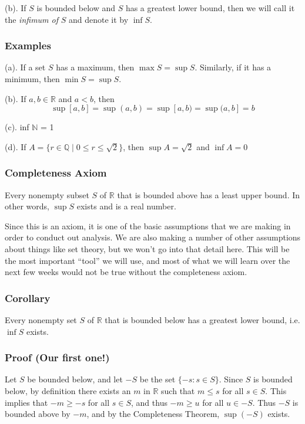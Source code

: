 \documentclass[]{article}
\begin{document}
(b). If $S$ is bounded below and $S$ has a greatest lower bound, then we
will call it the \emph{infimum of} $S$ and denote it by $\inf S$.

\subsubsection{Examples}

(a). If a set $S$ has a maximum, then $\max S = \sup S$. Similarly, if
it has a minimum, then $\min S = \sup S$.

(b). If $a,b \in \mathbb{R}$ and $a < b$, then
\[ \sup [a,b] = \sup(a,b) = \sup[a,b) = \sup(a,b] = b \]

(c). inf $\mathbb{N}$ = 1

(d). If $A = \{r \in \mathbb{Q} \mid 0 \le r \le \sqrt{2} \}$, then
$\sup A = \sqrt{2}$ and $\inf A = 0$

\subsubsection{Completeness Axiom}

Every nonempty subset $S$ of $\mathbb{R}$ that is bounded above has a
least upper bound. In other words, $\sup S$ exists and is a real number.

Since this is an axiom, it is one of the basic assumptions that we are
making in order to conduct out analysis. We are also making a number of
other assumptions about things like set theory, but we won't go into
that detail here. This will be the most important ``tool'' we will use,
and most of what we will learn over the next few weeks would not be true
without the completeness axiom.

\subsubsection{Corollary}

Every nonempty set $S$ of $\mathbb{R}$ that is bounded below has a
greatest lower bound, i.e. $\inf S$ exists.

\subsubsection{Proof (Our first one!)}

Let $S$ be bounded below, and let $-S$ be the set $\{-s : s \in S\}$.
Since $S$ is bounded below, by definition there exists an $m$ in
$\mathbb{R}$ such that $m \le s$ for all $s \in S$. This implies that
$-m \ge -s$ for all $s \in S$, and thus $-m \ge u$ for all $u \in -S$.
Thus $-S$ is bounded above by $-m$, and by the Completeness Theorem,
$\sup(-S)$ exists.
\end{document}
